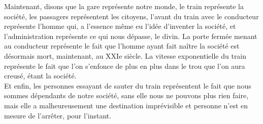 \documentclass[twocolumn, french]{article}
\begin{document}
Maintenant, disons que la gare représente notre monde, le train représente la société, les 
passagers représentent les citoyens, l'avant du train avec le conducteur représente l'homme qui, 
a l'essence même eu l'idée d'inventer la société, et l'administration représente ce qui nous dépasse, le divin.
La porte fermée menant au conducteur représente le fait que l'homme ayant fait naître la 
société est désormais mort, maintenant, au XXIe siècle. La vitesse exponentielle du train représente le fait que 
l'on s'enfonce de plus en plus dans le trou que l'on aura creusé, étant la société. 
\\
Et enfin, les personnes essayant de sauter du train représentent le fait que nous sommes dépendants de notre société, 
sans elle nous ne pouvons plus rien faire, mais elle a malheureusement une destination imprévisible et personne n'est 
en mesure de l'arrêter, pour l'instant.
\end{document}
